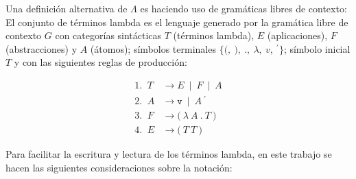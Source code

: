 Una definición alternativa de \(\Lambda\) es haciendo uso de gramáticas libres
de contexto: El conjunto de términos lambda es el lenguaje generado por la
gramática libre de contexto \(G\) con categorías sintácticas \(T\) (términos
lambda), \(E\) (aplicaciones), \(F\) (abstracciones) y \(A\) (átomos); símbolos
terminales \(\{\texttt{(},\ \texttt{)},\ \texttt{.},\ \lambda,\ v,\
{}^{\prime}\}\); símbolo inicial \(T\) y con las siguientes reglas de
producción:

\begin{align*}
  \text{1. }\ T &\rightarrow E\ \mid\ F\ \mid\ A \\ 
  \text{2. }\ A &\rightarrow \texttt{v}\ \mid\ A\ {}^{\prime} \\
  \text{3. }\ F &\rightarrow \texttt{(}\ \lambda\ A\ \texttt{.}\ T\ \texttt{)} \\
  \text{4. }\ E &\rightarrow \texttt{(}\ T\ T\ \texttt{)}
\end{align*}

Para facilitar la escritura y lectura de los términos lambda, en este trabajo se
hacen las siguientes consideraciones sobre la notación: \\

